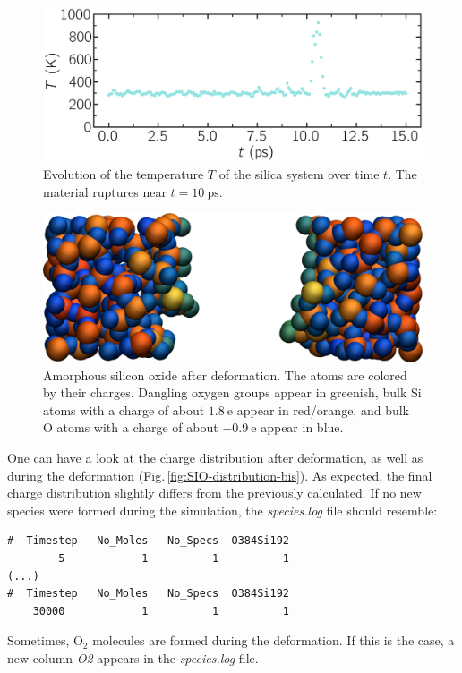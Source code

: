 \documentclass[9pt,tutorial]{livecoms}
\begin{document}
\begin{figure}
\includegraphics[width=\linewidth]{SIO-temperature}
\caption{Evolution of the temperature $T$ of the silica system over time $t$.
The material ruptures near $t = 10~\text{ps}$.}
\label{fig:SIO-temperature}
\end{figure}

\begin{figure}
\includegraphics[width=\linewidth]{SIO-deformed}
\caption{Amorphous silicon oxide after deformation. The atoms are colored by their
charges. Dangling oxygen groups appear in greenish, bulk Si atoms with a charge of
about $1.8~\text{e}$  appear in red/orange, and bulk O atoms with a charge of
about $-0.9 ~ \text{e}$ appear in blue.}
\label{fig:SIO-deformed}
\end{figure}

One can have a look at the charge distribution after deformation, as well as during
the deformation (Fig.\,\ref{fig:SIO-distribution-bis}). As expected, the final
charge distribution slightly differs from the previously calculated. If
no new species were formed during the simulation, the \textit{species.log} file
should resemble:
\begin{lstlisting}
#  Timestep   No_Moles   No_Specs  O384Si192
        5            1          1          1
(...)
#  Timestep   No_Moles   No_Specs  O384Si192
    30000            1          1          1
\end{lstlisting}
Sometimes, $\text{O}_2$ molecules are formed during the deformation. If this is
the case, a new column \textit{O2} appears in the \textit{species.log} file.
\end{document}
